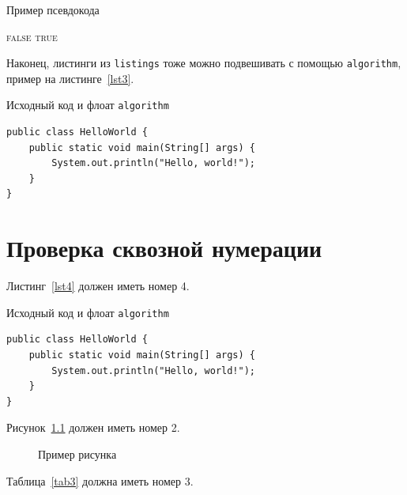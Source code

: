 \documentclass[]{itmo-student-thesis}
\begin{document}
\begin{algorithm}[!h]
\caption{Пример псевдокода}\label{lst2}
\begin{algorithmic}
				\State\Return \textsc{false}
			\EndIf
		\EndFor
		\State\Return \textsc{true}
	\EndFunction
\end{algorithmic}
\end{algorithm}

Наконец, листинги из \texttt{listings} тоже можно подвешивать с помощью \texttt{algorithm},
пример на листинге~\ref{lst3}.

\begin{algorithm}[!h]
\caption{Исходный код и флоат \texttt{algorithm}}\label{lst3}
\begin{lstlisting}
public class HelloWorld {
	public static void main(String[] args) {
		System.out.println("Hello, world!");
	}
}
\end{lstlisting}
\end{algorithm}

\chapter{Проверка сквозной нумерации}

Листинг~\ref{lst4} должен иметь номер 4.

\begin{algorithm}[!h]
\caption{Исходный код и флоат \texttt{algorithm}}\label{lst4}
\begin{lstlisting}
public class HelloWorld {
	public static void main(String[] args) {
		System.out.println("Hello, world!");
	}
}
\end{lstlisting}
\end{algorithm}

Рисунок~\ref{fig2} должен иметь номер 2.

\begin{figure}[!h]
\caption{Пример рисунка}\label{fig2}
\centering
{}
\end{figure}

Таблица~\ref{tab3} должна иметь номер 3.
\end{document}
